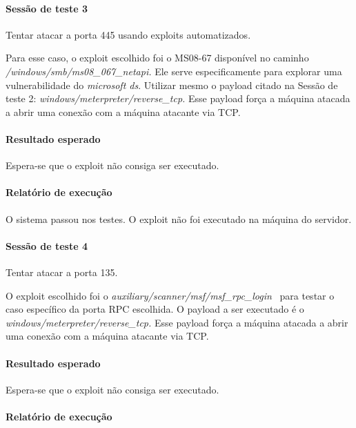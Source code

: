 \documentclass[
    12pt,               %
    openright,          %
    oneside,            %
    a4paper,            %
    section=TITLE,     %
    english,            %
    french,             %
    spanish,            %
    brazil              %
    ]{abntex2}
\begin{document}
\paragraph*{Sessão de teste 3}

Tentar atacar a porta 445 usando exploits automatizados.


Para esse caso, o exploit escolhido foi o MS08-67 disponível no caminho \emph{/windows/smb/ms08\_067\_netapi. }Ele serve especificamente para explorar uma vulnerabilidade do \emph{microsoft ds}. Utilizar mesmo o payload citado na Sessão de teste 2: \emph{windows/meterpreter/reverse\_tcp.} Esse payload força a máquina atacada a abrir uma conexão com a máquina atacante via TCP.



\paragraph*{Resultado esperado}

Espera-se que o exploit não consiga ser executado.



\paragraph*{Relatório de execução}

O sistema passou nos testes. O exploit não foi executado na máquina do servidor.



\paragraph*{Sessão de teste 4}

Tentar atacar a porta 135.


O exploit escolhido foi o \emph{auxiliary/scanner/msf/msf\_rpc\_login}~ para testar o caso específico da porta RPC escolhida. O payload a ser executado é o \emph{windows/meterpreter/reverse\_tcp.} Esse payload força a máquina atacada a abrir uma conexão com a máquina atacante via TCP.



\paragraph*{Resultado esperado}

Espera-se que o exploit não consiga ser executado.



\paragraph*{Relatório de execução}
\end{document}
